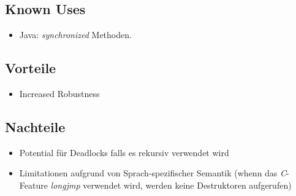 \subsection{Known Uses}

\begin{itemize}
	\item Java: \emph{synchronized} Methoden.
\end{itemize}

\subsection{Vorteile}

\begin{itemize}
	\item Increased Robustness
\end{itemize}

\subsection{Nachteile}

\begin{itemize}
	\item Potential für Deadlocks falls es rekursiv verwendet wird
	\item Limitationen aufgrund von Sprach-spezifischer Semantik (whenn das \emph{C}-Feature \emph{longjmp} verwendet wird, werden keine Destruktoren aufgerufen)
\end{itemize}

